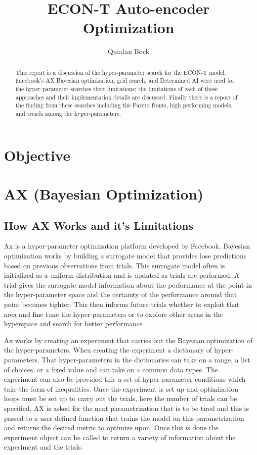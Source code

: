 \documentclass{article}
\title{ECON-T Auto-encoder Optimization}
\author{Quinlan Bock}
\affil{Fermi National Laboratory}
\begin{document}
\maketitle

\begin{abstract}
This report is a discussion of the hyper-parameter search for the ECON-T model. Facebook's AX Bayesian optimization, grid search, and Determined AI were used for the hyper-parameter searches their limitations; the limitations of each of these approaches and their implementation details are discussed. Finally there is a report of the finding from these searches including the Pareto fronts, high performing models, and trends among the hyper-parameters.
\end{abstract}

\section{Objective}

\section{AX (Bayesian Optimization)}
\subsection{How AX Works and it's Limitations}
Ax is a hyper-parameter optimization platform developed by Facebook. Bayesian optimization works by building a surrogate model that provides lose predictions based on previous observations from trials. This surrogate model often is initialized as a uniform distribution and is updated as trials are performed. A trial gives the surrogate model information about the performance at the point in the hyper-parameter space and the certainty of the performance around that point becomes tighter. This then informs future trials whether to exploit that area and fine tune the hyper-parameters or to explore other areas in the hyperspace and search for better performance

Ax works by creating an experiment that carries out the Bayesian optimization of the hyper-parameters. When creating the experiment a dictionary of hyper-parameters. That hyper-parameters in the dictionaries can take on a range, a list of choices, or a fixed value and can take on a common data types. The experiment can also be provided this a set of hyper-parameter conditions which take the form of inequalities. Once the experiment is set up and optimization loops must be set up to carry out the trials, here the number of trials can be specified, AX is asked for the next parametrization that is to be tired and this is passed to a user defined function that trains the model on this parametrization and returns the desired metric to optimize upon. Once this is done the experiment object can be called to return a variety of information about the experiment and the trials.
\end{document}
